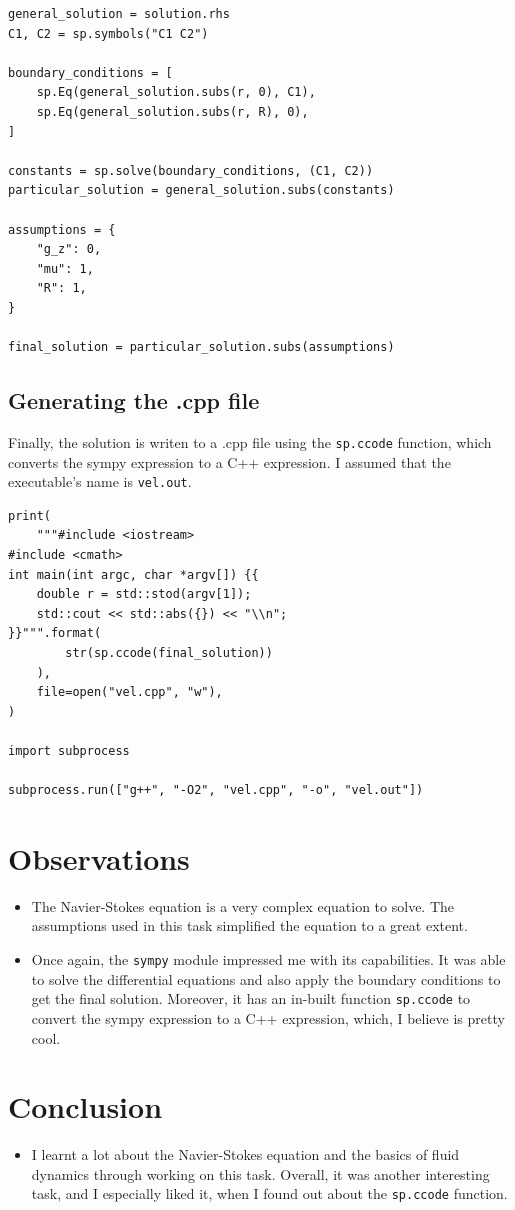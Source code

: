 \documentclass[12pt]{report}
\begin{document}
\begin{lstlisting}[caption={Applying the boundary conditions}]
general_solution = solution.rhs
C1, C2 = sp.symbols("C1 C2")

boundary_conditions = [
    sp.Eq(general_solution.subs(r, 0), C1),
    sp.Eq(general_solution.subs(r, R), 0),
]

constants = sp.solve(boundary_conditions, (C1, C2))
particular_solution = general_solution.subs(constants)

assumptions = {
    "g_z": 0,
    "mu": 1,
    "R": 1,
}

final_solution = particular_solution.subs(assumptions)
\end{lstlisting}

\subsection{Generating the .cpp file}
Finally, the solution is writen to a .cpp file using the \texttt{sp.ccode} function, which converts the sympy expression to a C++ expression. I assumed that the executable's name is \texttt{vel.out}.

\begin{lstlisting}
print(
    """#include <iostream>
#include <cmath>
int main(int argc, char *argv[]) {{
    double r = std::stod(argv[1]);
    std::cout << std::abs({}) << "\\n";
}}""".format(
        str(sp.ccode(final_solution))
    ),
    file=open("vel.cpp", "w"),
)

import subprocess

subprocess.run(["g++", "-O2", "vel.cpp", "-o", "vel.out"])
\end{lstlisting}
\section{Observations}
\begin{itemize}
    \item The Navier-Stokes equation is a very complex equation to solve. The assumptions used in this task simplified the equation to a great extent.
    \item Once again, the \texttt{sympy} module impressed me with its capabilities. It was able to solve the differential equations and also apply the boundary conditions to get the final solution. Moreover, it has an in-built function \texttt{sp.ccode} to convert the sympy expression to a C++ expression, which, I believe is pretty cool.
\end{itemize}
\section{Conclusion}

\begin{itemize}
    \item I learnt a lot about the Navier-Stokes equation and the basics of fluid dynamics through working on this task. Overall, it was another interesting task, and I especially liked it, when I found out about the \texttt{sp.ccode} function.
\end{itemize}

\printbibliography
\end{document}
